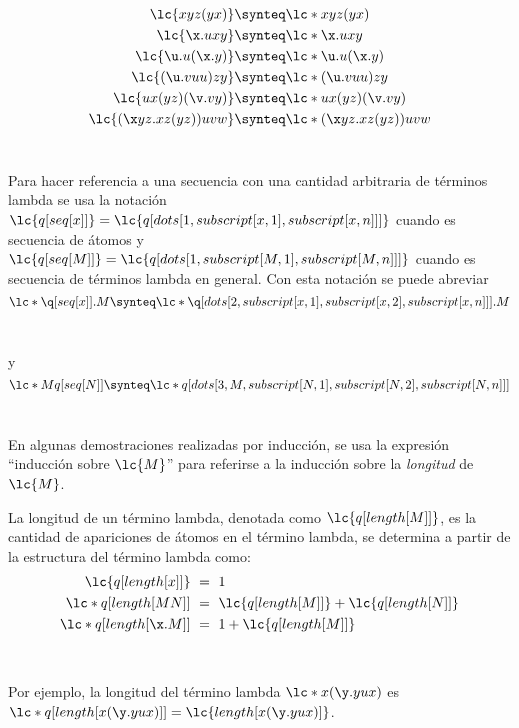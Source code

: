 \begin{align*}
  \lc{x y z (y x)} & \synteq \lc*{x y z (y x)}\\
  \lc{\x.u x y} & \synteq \lc*{\x.u x y}\\
  \lc{\u.u(\x.y)} & \synteq \lc*{\u.u(\x.y)}\\
  \lc{(\u.v u u)z y} & \synteq \lc*{(\u.v u u)z y}\\
  \lc{u x(y z)(\v.v y)} & \synteq \lc*{u x(y z)(\v.v y)}\\
  \lc{(\x y z.x z(y z))u v w} & \synteq \lc*{(\x y z.x z(y z))u v w}
\end{align*} \

Para hacer referencia a una secuencia con una cantidad arbitraria de términos
lambda se usa la notación
\(\lc{q[seq[x]]}=\lc{q[dots[1,subscript[x,1],subscript[x,n]]]}\) cuando es
secuencia de átomos y
\(\lc{q[seq[M]]}=\lc{q[dots[1,subscript[M,1],subscript[M,n]]]}\) cuando es
secuencia de términos lambda en general. Con esta notación se puede abreviar \\

\[\lc*{\q[seq[x]].M} \synteq 
  \lc*{\q[dots[2,subscript[x,1],subscript[x,2],subscript[x,n]]].M}\] \

y \\

\[\lc*{M q[seq[N]]} \synteq
  \lc*{q[dots[3,M,subscript[N,1],subscript[N,2],subscript[N,n]]]}\] \

En algunas demostraciones realizadas por inducción, se usa la expresión
``inducción sobre \(\lc{M}\)'' para referirse a la inducción sobre la
\emph{longitud} de \(\lc{M}\). \\

\begin{defi}[Longitud] La longitud de un término lambda, denotada como
  \(\lc{q[length[M]]}\), es la cantidad de apariciones de átomos en el término
  lambda, se determina a partir de la estructura del término lambda como: \
  \label{definicion:longitud}
  \begin{align*}
    \lc{q[length[x]]}\ &=\ 1 \\
    \lc*{q[length[M N]]}\ &=\ \lc{q[length[M]]} + \lc{q[length[N]]} \\
    \lc*{q[length[\x.M]]}\ &=\ 1 + \lc{q[length[M]]}
  \end{align*}
\end{defi} \

Por ejemplo, la longitud del término lambda \(\lc*{x(\y.y u x)}\) es
\(\lc*{q[length[x(\y.y u x)]]}=\lc{length[x(\y.y u x)]}\). \\

